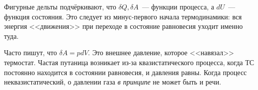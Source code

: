 \documentclass[../main.tex]{subfiles}
\begin{document}
    \begin{note}
        Фигурные дельты подчёркивают, что $\delta Q, \delta A$~--- функции процесса, а $dU$~--- функция состояния. Это следует из минус-первого начала термодинамики: вся энергия <<движения>> при переходе в состояние равновесия уходит именно туда. 
    \end{note}

    \begin{note}
        Часто пишут, что $\delta A = p dV$. Это внешнее давление, которое <<навязал>> термостат. Частая путаница возникает из-за квазистатического процесса, когда ТС постоянно находится в состоянии равновесия, и давления равны. Когда процесс неквазистатический, о давлении газа \emph{в принципе} не может быть и речи.
    \end{note}
\end{document}
